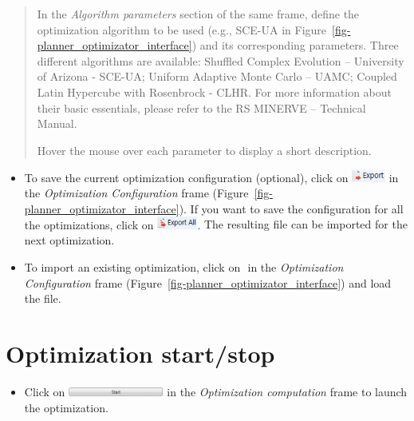 \documentclass[
  letterpaper,
  DIV=11,
  numbers=noendperiod]{scrreprt}
\providecommand{\tightlist}{%
  \setlength{\itemsep}{0pt}\setlength{\parskip}{0pt}}\usepackage{longtable,booktabs,array}
\begin{document}
\begin{quote}
In the \emph{Algorithm parameters} section of the same frame, define the
optimization algorithm to be used (e.g., SCE-UA in
Figure~\ref{fig-planner_optimizator_interface}) and its corresponding
parameters. Three different algorithms are available: Shuffled Complex
Evolution -- University of Arizona - SCE-UA; Uniform Adaptive Monte
Carlo -- UAMC; Coupled Latin Hypercube with Rosenbrock - CLHR. For more
information about their basic essentials, please refer to the RS MINERVE
-- Technical Manual.

Hover the mouse over each parameter to display a short description.
\end{quote}

\begin{itemize}
\item
  {To save the current optimization configuration (optional), click on
  \includegraphics[width=\textwidth,height=0.16in]{./figures/fig-icon_calibrator_export_config.png}
  in the \emph{Optimization Configuration} frame
  (Figure~\ref{fig-planner_optimizator_interface}). If you want to save
  the configuration for all the optimizations, click on
  \includegraphics[width=\textwidth,height=0.16in]{./figures/fig-icon_calibrator_export_all_config.png}.}
  The resulting file can be imported for the next optimization.
\item
  {To import an existing optimization, click on
  \includegraphics[width=\textwidth,height=0in]{./figures/fig-icon_calibrator_import_config.png}
  in the \emph{Optimization Configuration} frame
  (Figure~\ref{fig-planner_optimizator_interface}) and load the file.}
\end{itemize}

\hypertarget{optimization-startstop}{%
\section{Optimization start/stop}\label{optimization-startstop}}

\begin{itemize}
\tightlist
\item
  {Click on
  \includegraphics[width=\textwidth,height=0.11in]{./figures/fig-icon_calibrator_start.png}
  in the \emph{Optimization computation} frame to launch the
  optimization.}
\end{itemize}
\end{document}
